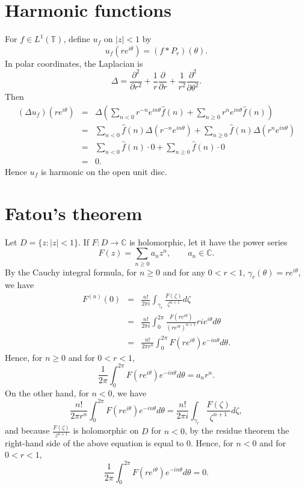 \documentclass{article}
\theoremstyle{definition}
\begin{document}
\section{Harmonic functions}
For $f \in L^1(\mathbb{T})$, define $u_f$ on $|z|<1$ by
\[
u_f(re^{i\theta})=(f*P_r)(\theta).
\]
In polar coordinates, the Laplacian is
\[
\Delta=\frac{\partial^2}{\partial r^2}+\frac{1}{r}\frac{\partial}{\partial r}+\frac{1}{r^2}\frac{\partial^2}{\partial 
\theta^2}.
\]
Then
\begin{eqnarray*}
(\Delta u_f)(re^{i\theta})&=&\Delta \left( \sum_{n<0} r^{-n} e^{in\theta} \hat{f}(n) + \sum_{n \geq 0} r^n e^{in\theta} \hat{f}(n) \right)\\
&=&\sum_{n<0} \hat{f}(n) \Delta\left(r^{-n} e^{in\theta}\right) + \sum_{n \geq 0} \hat{f}(n)\Delta\left(  r^n e^{in\theta} \right)\\
&=&\sum_{n<0} \hat{f}(n) \cdot 0 + \sum_{n \geq 0} \hat{f}(n) \cdot 0\\
&=&0.
\end{eqnarray*}
Hence $u_f$ is harmonic on the open unit disc.

\section{Fatou's theorem}
\label{fatou}
Let $D=\{z:|z|<1\}$. 
If $F:D \to \mathbb{C}$ is holomorphic, let it have the power series
\[
F(z)=\sum_{n \geq 0} a_n z^n, \qquad a_n \in \mathbb{C}.
\]
By the Cauchy integral formula, for $n \geq 0$ and for any $0<r<1$,  $\gamma_r(\theta)=re^{i\theta}$,  we have
\begin{eqnarray*}
F^{(n)}(0)&=&\frac{n!}{2\pi i} \int_{\gamma_r} \frac{F(\zeta)}{\zeta^{n+1}} d\zeta\\
&=&\frac{n!}{2\pi i} \int_0^{2\pi} \frac{F(re^{i\theta})}{(re^{i\theta})^{n+1}} rie^{i\theta} d\theta\\
&=&\frac{n!}{2\pi r^n} \int_0^{2\pi} F(re^{i\theta}) e^{-in\theta} d\theta.
\end{eqnarray*}
Hence, for $n \geq 0$ and for $0<r<1$,
\[
\frac{1}{2\pi} \int_0^{2\pi} F(re^{i\theta}) e^{-in\theta} d\theta=a_n r^n.
\]
On the other hand, for $n<0$, we have
\[
\frac{n!}{2\pi r^n} \int_0^{2\pi} F(re^{i\theta}) e^{-in\theta} d\theta=\frac{n!}{2\pi i} \int_{\gamma_r} \frac{F(\zeta)}{\zeta^{n+1}} d\zeta,
\]
and because $\frac{F(\zeta)}{ z^{n+1}}$ is holomorphic on $D$ for $n<0$, by the residue theorem the right-hand side of the above equation is equal to $0$. Hence,
for $n < 0$ and for $0<r<1$,
\[
\frac{1}{2\pi} \int_0^{2\pi} F(re^{i\theta}) e^{-in\theta} d\theta=0.
\]
\end{document}
